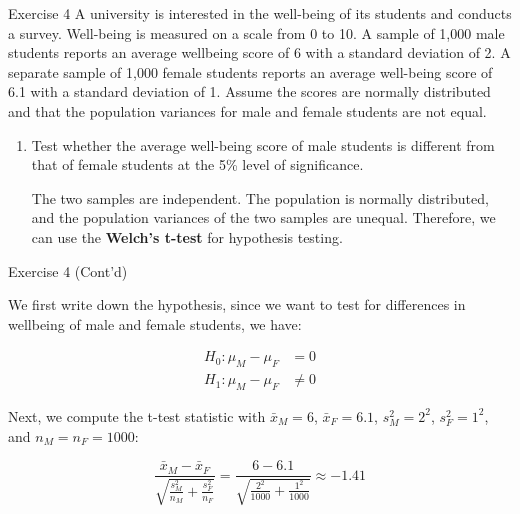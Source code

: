 \documentclass[
  ignorenonframetext,
  aspectratio=43,
]{beamer}
\let\olditem\item
\renewcommand\item{\olditem\justifying}
\begin{document}
\begin{frame}{Exercise 4}
\protect\hypertarget{exercise-4}{}
A university is interested in the well-being of its students and
conducts a survey. Well-being is measured on a scale from 0 to 10. A
sample of 1,000 male students reports an average wellbeing score of 6
with a standard deviation of 2. A separate sample of 1,000 female
students reports an average well-being score of 6.1 with a standard
deviation of 1. Assume the scores are normally distributed and that the
population variances for male and female students are not equal.

\begin{enumerate}
\item
  Test whether the average well-being score of male students is
  different from that of female students at the 5\% level of
  significance.

  \pause

  The two samples are independent. The population is normally
  distributed, and the population variances of the two samples are
  unequal. Therefore, we can use the \textbf{Welch's t-test} for
  hypothesis testing.
\end{enumerate}
\end{frame}

\begin{frame}{Exercise 4 (Cont'd)}
\protect\hypertarget{exercise-4-contd}{}
\pause

We first write down the hypothesis, since we want to test for
differences in wellbeing of male and female students, we have:
\vspace{-2pt}

\pause

\[
\begin{aligned}
H_0: \mu_M - \mu_F &= 0 \\
H_1: \mu_M - \mu_F &\neq 0
\end{aligned}
\]

\pause

Next, we compute the t-test statistic with \(\bar{x}_M = 6\),
\(\bar{x}_F = 6.1\), \(s_M^2 = 2^2\), \(s_F^2 = 1^2\), and
\(n_M = n_F = 1000\):

\pause

\[
\frac{\bar{x}_M - \bar{x}_F}
     {\sqrt{\frac{s_M^2}{n_M} + \frac{s_F^2}{n_F}}}
=
\frac{6 - 6.1}{\sqrt{\frac{2^2}{1000} + \frac{1^2}{1000}}}
\approx -1.41
\]
\end{frame}
\end{document}
